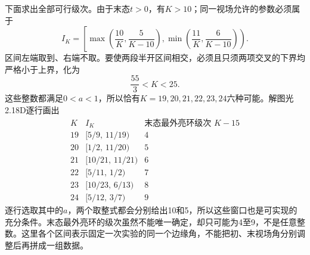 \documentclass[UTF8,fontset=fandol,a4paper,11pt]{ctexart}
\begin{document}
下面求出全部可行级次。由于末态$t>0$，有$K>10$；同一视场允许的参数必须属于
\[
I_K=\left[\max\!\left(\frac{10}{K},\frac5{K-10}\right),
\min\!\left(\frac{11}{K},\frac6{K-10}\right)\right).
\]
区间左端取到、右端不取。要使两段半开区间相交，必须且只须两项交叉的下界均严格小于上界，化为
\[
\frac{55}{3}<K<25.
\]
这些整数都满足$0<a<1$，所以恰有$K=19,20,21,22,23,24$六种可能。解图光2.18D逐行画出
\[
\begin{array}{c|c|c}
K&I_K&\text{末态最外亮环级次 }K-15\\\hline
19&[5/9,\,11/19)&4\\
20&[1/2,\,11/20)&5\\
21&[10/21,\,11/21)&6\\
22&[5/11,\,1/2)&7\\
23&[10/23,\,6/13)&8\\
24&[5/12,\,3/7)&9
\end{array}
\]
逐行选取其中的$a$，两个取整式都会分别给出10和5，所以这些窗口也是可实现的充分条件。末态最外亮环的级次虽然不能唯一确定，却只可能为4至9，不是任意整数。这里各个区间表示固定一次实验的同一个边缘角，不能把初、末视场角分别调整后再拼成一组数据。
\end{document}

